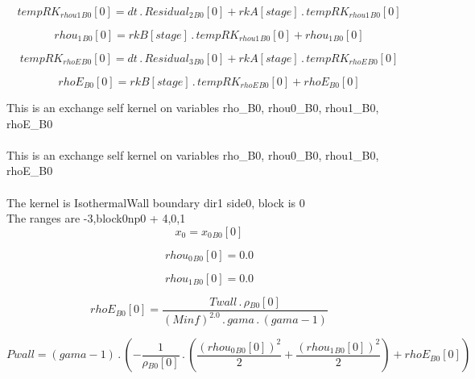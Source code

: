 \documentclass{article}
\begin{document}
\begin{dmath}{tempRK_{rhou1}{_{B0}}}[{0}] = dt \,.\, {Residual_{2}{_{B0}}}[{0}] + {rkA}[{stage}] \,.\, {tempRK_{rhou1}{_{B0}}}[{0}]\end{dmath}

\begin{dmath}{rhou_{1}{_{B0}}}[{0}] = {rkB}[{stage}] \,.\, {tempRK_{rhou1}{_{B0}}}[{0}] + {rhou_{1}{_{B0}}}[{0}]\end{dmath}

\begin{dmath}{tempRK_{rhoE}{_{B0}}}[{0}] = dt \,.\, {Residual_{3}{_{B0}}}[{0}] + {rkA}[{stage}] \,.\, {tempRK_{rhoE}{_{B0}}}[{0}]\end{dmath}

\begin{dmath}{rhoE{_{B0}}}[{0}] = {rkB}[{stage}] \,.\, {tempRK_{rhoE}{_{B0}}}[{0}] + {rhoE{_{B0}}}[{0}]\end{dmath}

\noindent This is an exchange self kernel on variables rho_B0, rhou0_B0, rhou1_B0, rhoE_B0\\\\\noindent This is an exchange self kernel on variables rho_B0, rhou0_B0, rhou1_B0, rhoE_B0\\\\\noindent The kernel is IsothermalWall boundary dir1 side0, block is 0\\\noindent The ranges are -3,block0np0 + 4,0,1\\\begin{dmath}x_{0} = {x_{0}{_{B0}}}[{0}]\end{dmath}

\begin{dmath}{rhou_{0}{_{B0}}}[{0}] = 0.0\end{dmath}

\begin{dmath}{rhou_{1}{_{B0}}}[{0}] = 0.0\end{dmath}

\begin{dmath}{rhoE{_{B0}}}[{0}] = \frac{Twall \,.\, {\rho{_{B0}}}[{0}]}{\left(Minf \right)^{2.0} \,.\, gama \,.\, \left(gama - 1\right)}\end{dmath}

\begin{dmath}Pwall = \left(gama - 1\right) \,.\, \left(- \frac{1}{{\rho{_{B0}}}[{0}]} \,.\, \left(\frac{\left({rhou_{0}{_{B0}}}[{0}] \right)^{2}}{2} + \frac{\left({rhou_{1}{_{B0}}}[{0}] \right)^{2}}{2}\right) + {rhoE{_{B0}}}[{0}]\right)\end{dmath}
\end{document}
